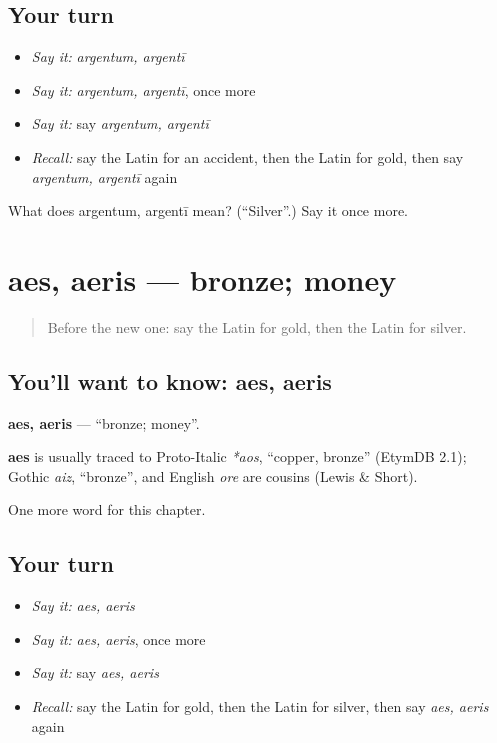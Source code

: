 \subsection*{Your turn}
\begin{itemize}
\raggedright
  \item \emph{Say it:} \emph{argentum, argentī}
  \item \emph{Say it:} \emph{argentum, argentī}, once more
  \item \emph{Say it:} say \emph{argentum, argentī}
  \item \emph{Recall:} say the Latin for an accident, then the Latin for gold, then say \emph{argentum, argentī} again
\end{itemize}

\begin{tcolorbox}[breakable,colback=teal!4,colframe=teal!35!black,title={Before you move on}]
What does argentum, argentī mean? (\textquotedblleft{}Silver\textquotedblright{}.) Say it once more.
\end{tcolorbox}
\section[aes, aeris]{aes, aeris — bronze; money}

\label{lesson:LA-C222-aes}



\begin{quote}
Before the new one: say the Latin for gold, then the Latin for silver.
\end{quote}

\subsection*{You'll want to know: aes, aeris}
\textbf{aes, aeris} — \textquotedblleft{}bronze; money\textquotedblright{}.

\begin{cousinweb}
\textbf{aes} is usually traced to Proto-Italic \emph{*aos}, \textquotedblleft{}copper, bronze\textquotedblright{} (EtymDB 2.1); Gothic \emph{aiz}, \textquotedblleft{}bronze\textquotedblright{}, and English \emph{ore} are cousins (Lewis \& Short).
\end{cousinweb}

\begin{grammarlens}[title={What you've built}]
One more word for this chapter.
\end{grammarlens}

\subsection*{Your turn}
\begin{itemize}
\raggedright
  \item \emph{Say it:} \emph{aes, aeris}
  \item \emph{Say it:} \emph{aes, aeris}, once more
  \item \emph{Say it:} say \emph{aes, aeris}
  \item \emph{Recall:} say the Latin for gold, then the Latin for silver, then say \emph{aes, aeris} again
\end{itemize}

